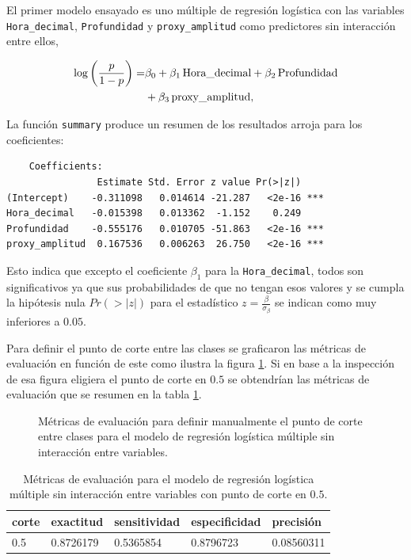 \documentclass[a4paper]{report}
\begin{document}
El primer modelo ensayado es uno múltiple de regresión logística con las variables \verb'Hora_decimal', \verb'Profundidad' y \verb'proxy_amplitud' como predictores sin interacción entre ellos,

\begin{align}
	\log \left( \frac{p}{1-p} \right) = &
	 \beta_0 + \beta_1\, \text{Hora\_decimal} + \beta_2 \, \text{Profundidad}\notag\\
	& + \beta_3 \, \text{proxy\_amplitud},
	\label{eq:regresion_logistica}
\end{align}

La función \verb'summary' produce un resumen de los resultados arroja para los coeficientes:
\begin{verbatim}
	Coefficients:
                Estimate Std. Error z value Pr(>|z|)    
(Intercept)    -0.311098   0.014614 -21.287   <2e-16 ***
Hora_decimal   -0.015398   0.013362  -1.152    0.249    
Profundidad    -0.555176   0.010705 -51.863   <2e-16 ***
proxy_amplitud  0.167536   0.006263  26.750   <2e-16 ***
\end{verbatim} 
Esto indica que excepto el coeficiente \(\beta_1\) para la \verb'Hora_decimal', todos son significativos ya que sus probabilidades de que no tengan esos valores y se cumpla la hipótesis nula \(Pr(>|z|)\) para el estadístico \(z = \frac{\beta}{\sigma_\beta}\) se indican como muy inferiores a \(0.05\).

Para definir el punto de corte entre las clases se graficaron las métricas de evaluación en función de este como ilustra la figura \ref{fig:múltiple_metrics}.
Si en base a la inspección de esa figura eligiera el punto de corte en \(0.5\) se obtendrían las métricas de evaluación que se resumen en la tabla \ref{tab:múltiple_metrics}.

\begin{figure}[!h]
	\centering
	
	\caption{Métricas de evaluación para definir manualmente el punto de corte entre clases para el modelo de regresión logística múltiple sin interacción entre variables.}
	\label{fig:múltiple_metrics}
\end{figure}

\begin{table}[h]
\centering
\begin{tabular}{lllll}
\toprule
corte & exactitud & sensitividad & especificidad & precisión \\
\midrule
\num{0.5} & \num{0.8726179} & \num{0.5365854} & \num{0.8796723} & \num{0.08560311} \\
\bottomrule
\end{tabular}
\caption{Métricas de evaluación para el modelo de regresión logística múltiple sin interacción entre variables con punto de corte en \(0.5\).}
\label{tab:múltiple_metrics}
\end{table}
\end{document}
